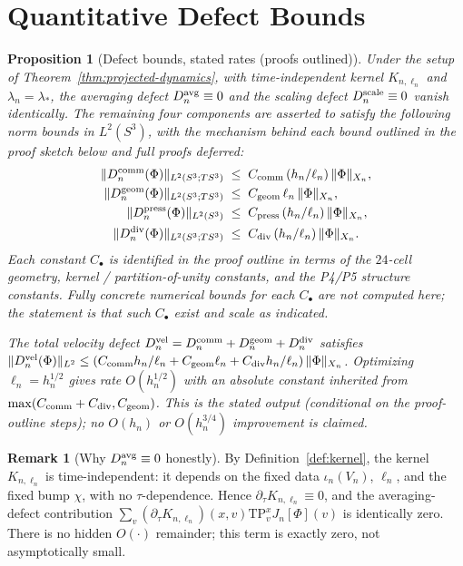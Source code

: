 \documentclass[11pt, a4paper]{amsart}
\newtheorem{proposition}[theorem]{Proposition}
\theoremstyle{definition}
\newtheorem{remark}[theorem]{Remark}
\begin{document}
\section{Quantitative Defect Bounds}
\label{sec:defect-bounds}

\begin{proposition}[Defect bounds, stated rates (proofs outlined)]
\label{prop:defect-bounds}
Under the setup of Theorem~\ref{thm:projected-dynamics}, with
time-independent kernel $K_{n, \ell_n}$ and $\lambda_n =
\lambda_\ast$, the averaging defect $D_n^{\rm avg} \equiv 0$
and the scaling defect $D_n^{\rm scale} \equiv 0$ vanish
identically. The remaining four components are asserted to
satisfy the following norm bounds in $L^2(S^3)$, with the
mechanism behind each bound outlined in the proof sketch below
and full proofs deferred:
\begin{align*}
  \|D_n^{\rm comm}(\Phi)\|_{L^2(S^3; TS^3)}
    &\;\leq\; C_{\rm comm}\,(h_n/\ell_n)\,\|\Phi\|_{X_n}, \\
  \|D_n^{\rm geom}(\Phi)\|_{L^2(S^3; TS^3)}
    &\;\leq\; C_{\rm geom}\,\ell_n\,\|\Phi\|_{X_n}, \\
  \|D_n^{\rm press}(\Phi)\|_{L^2(S^3)}
    &\;\leq\; C_{\rm press}\,(h_n/\ell_n)\,\|\Phi\|_{X_n}, \\
  \|D_n^{\rm div}(\Phi)\|_{L^2(S^3; TS^3)}
    &\;\leq\; C_{\rm div}\,(h_n/\ell_n)\,\|\Phi\|_{X_n}.
\end{align*}
Each constant $C_\bullet$ is identified in the proof outline in
terms of the $24$-cell geometry, kernel / partition-of-unity
constants, and the P4/P5 structure constants. Fully concrete
numerical bounds for each $C_\bullet$ are not computed here;
the statement is that such $C_\bullet$ exist and scale as
indicated.

The total \emph{velocity} defect
$D_n^{\rm vel} = D_n^{\rm comm} + D_n^{\rm geom} + D_n^{\rm
div}$ satisfies
$\|D_n^{\rm vel}(\Phi)\|_{L^2} \leq (C_{\rm comm} h_n/\ell_n +
C_{\rm geom} \ell_n + C_{\rm div} h_n/\ell_n)\,\|\Phi\|_{X_n}$.
Optimizing $\ell_n = h_n^{1/2}$ gives rate $O(h_n^{1/2})$ with
an absolute constant inherited from $\max(C_{\rm comm} +
C_{\rm div}, C_{\rm geom})$. This is the \emph{stated} output
(conditional on the proof-outline steps); no $O(h_n)$ or
$O(h_n^{3/4})$ improvement is claimed.
\end{proposition}

\begin{remark}[Why $D_n^{\rm avg} \equiv 0$ honestly]
\label{rmk:Davg-zero}
By Definition~\ref{def:kernel}, the kernel $K_{n, \ell_n}$ is
time-independent: it depends on the fixed data $\iota_n(V_n)$,
$\ell_n$, and the fixed bump $\chi$, with no $\tau$-dependence.
Hence $\partial_\tau K_{n, \ell_n} \equiv 0$, and the
averaging-defect contribution
$\sum_v (\partial_\tau K_{n, \ell_n})(x, v) \mathrm{TP}_v^x
J_n[\Phi](v)$ is identically zero. There is no hidden
$O(\cdot)$ remainder; this term is exactly zero, not
asymptotically small.
\end{remark}
\end{document}
